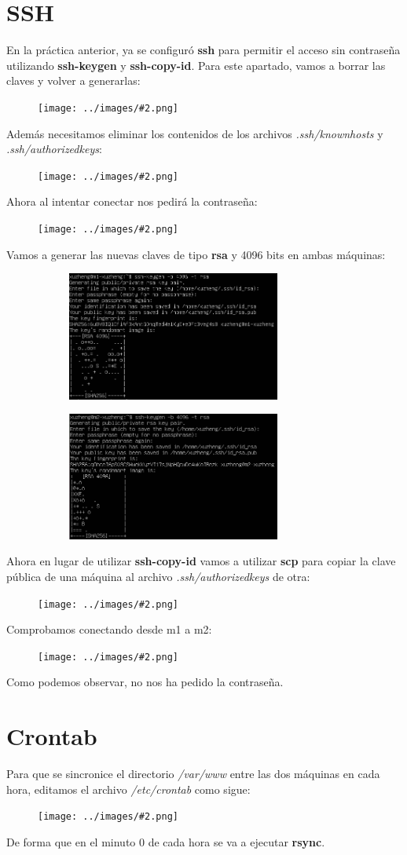 \documentclass[twoside]{article}
\newcommand{\image}[2]{
\begin{figure}[H]
    \texttt{[image: ../images/\#2.png]}
    \centering
\end{figure}
}
\begin{document}
\section{SSH}
En la práctica anterior, ya se configuró \textbf{ssh} para permitir el acceso sin contraseña utilizando \textbf{ssh-keygen} y \textbf{ssh-copy-id}. Para este apartado, vamos a borrar las claves y volver a generarlas:
\image{10}{12}
Además necesitamos eliminar los contenidos de los archivos \textit{.ssh/known\textunderscore hosts} y \textit{.ssh/authorized\textunderscore keys}:
\image{10}{16}
Ahora al intentar conectar nos pedirá la contraseña:
\image{12}{17}
Vamos a generar las nuevas claves de tipo \textbf{rsa} y 4096 bits en ambas máquinas:
\begin{figure}[H]
    \centering
    \begin{subfigure}{.5\textwidth}
        \centering
        \includegraphics[width=7cm]{../images/13.png}
    \end{subfigure}%
    \begin{subfigure}{.5\textwidth}
        \centering
        \includegraphics[width=7cm]{../images/14.png}
    \end{subfigure}
\end{figure}
Ahora en lugar de utilizar \textbf{ssh-copy-id} vamos a utilizar \textbf{scp} para copiar la clave pública de una máquina al archivo \textit{.ssh/authorized\textunderscore keys} de otra:
\image{12}{18}
Comprobamos conectando desde m1 a m2:
\image{10}{19}
Como podemos observar, no nos ha pedido la contraseña.

\section{Crontab}
Para que se sincronice el directorio \textit{/var/www} entre las dos máquinas en cada hora,  editamos el archivo \textit{/etc/crontab} como sigue:
\image{12}{20}
De forma que en el minuto 0 de cada hora se va a ejecutar \textbf{rsync}.
\end{document}

